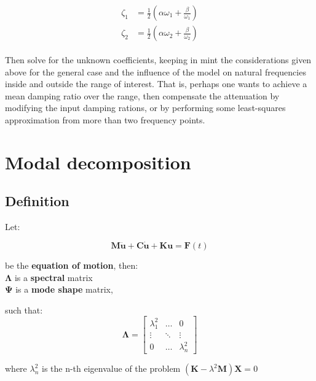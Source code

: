 \documentclass[10pt,b5paper,titlepage]{book}
\newenvironment{eqarray}
{
    \begin{eqnarray}
        \begin{aligned}
}
{
        \end{aligned}
    \end{eqnarray}
}
\begin{document}
\begin{eqarray}
    \zeta_1 &= \frac{1}{2} \left( \alpha \omega_1 + \frac{\beta}{\omega_1} \right)\\
    \zeta_2 &= \frac{1}{2} \left( \alpha \omega_2 + \frac{\beta}{\omega_2} \right)
\end{eqarray}

Then solve for the unknown coefficients, keeping in mint the considerations given
above for the general case and the influence of the model on natural frequencies
inside and outside the range of interest. That is, perhaps one wants to achieve
a mean damping ratio over the range, then compensate the attenuation by modifying
the input damping rations, or by performing some least-squares approximation from
more than two frequency points.







\newpage
\section{Modal decomposition}

\subsection{Definition}

Let:

\begin{equation}
    \mathbf{M}\ddot{\mathbf{u}} + \mathbf{C}\dot{\mathbf{u}} +  \mathbf{K}\mathbf{u} = \mathbf{F}\left( t \right)
\end{equation}

be the \textbf{equation of motion}, then:\\
$ \mathbf{\Lambda} $ is a \textbf{spectral} matrix\\
$ \mathbf{\Psi} $ is a \textbf{mode shape} matrix,

such that:
\begin{equation}
    \mathbf{\Lambda} =
    \begin{bmatrix}
        \lambda_1^2 & \dots & 0\\
        \vdots & \ddots & \vdots \\
        0 & \dots & \lambda_n^2
    \end{bmatrix}
\end{equation}

where $ \lambda_n^2 $ is the n-th eigenvalue of the problem
$ (\mathbf{K}-\lambda^2\mathbf{M})\mathbf{X} = 0 $
\end{document}
